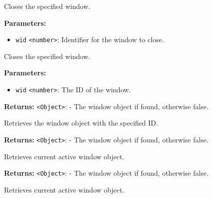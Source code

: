 \documentclass[12pt,a4paper]{article}
\begin{document}
\noindent Closes the specified window.

\vspace{5mm}
\noindent {}


\noindent \textbf{Parameters:}
\begin{itemize}
  \item \texttt{wid} \texttt{<number>}: Identifier for the window to close.
\end{itemize}

\noindent Closes the specified window.

\vspace{5mm}
\noindent {}


\noindent \textbf{Parameters:}
\begin{itemize}
  \item \texttt{wid} \texttt{<number>}: The ID of the window.
\end{itemize}

\noindent \textbf{Returns:} \texttt{<Object>}: - The window object if found, otherwise false.

\noindent Retrieves the window object with the specified ID.

\vspace{5mm}
\noindent {}


\noindent \textbf{Returns:} \texttt{<Object>}: - The window object if found, otherwise false.

\noindent Retrieves current active window object.

\vspace{5mm}
\noindent {}


\noindent \textbf{Returns:} \texttt{<Object>}: - The window object if found, otherwise false.

\noindent Retrieves current active window object.

\vspace{5mm}
\noindent {}
\end{document}
